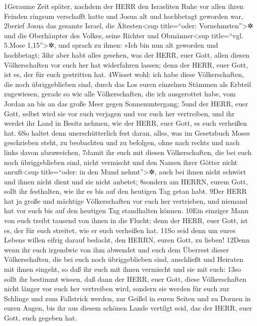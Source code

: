 1Geraume Zeit später, nachdem der HERR den Israeliten Ruhe vor allen
ihren Feinden ringsum verschafft hatte und Josua alt und hochbetagt
geworden war, 2berief Josua das gesamte Israel, die
Ältesten\textless sup title=``oder: Vornehmsten''\textgreater✲ und die
Oberhäupter des Volkes, seine Richter und Obmänner\textless sup
title=``vgl. 5.Mose 1,15''\textgreater✲, und sprach zu ihnen: »Ich bin
nun alt geworden und hochbetagt; 3ihr aber habt alles gesehen, was der
HERR, euer Gott, allen diesen Völkerschaften vor euch her hat
widerfahren lassen; denn der HERR, euer Gott, ist es, der für euch
gestritten hat. 4Wisset wohl: ich habe diese Völkerschaften, die noch
übriggeblieben sind, durch das Los euren einzelnen Stämmen als Erbteil
zugewiesen, gerade so wie alle Völkerschaften, die ich ausgerottet habe,
vom Jordan an bis an das große Meer gegen Sonnenuntergang; 5und der
HERR, euer Gott, selbst wird sie vor euch verjagen und vor euch her
vertreiben, und ihr werdet ihr Land in Besitz nehmen, wie der HERR, euer
Gott, es euch verheißen hat. 6So haltet denn unerschütterlich fest
daran, alles, was im Gesetzbuch Moses geschrieben steht, zu beobachten
und zu befolgen, ohne nach rechts und nach links davon abzuweichen,
7damit ihr euch mit diesen Völkerschaften, die bei euch noch
übriggeblieben sind, nicht vermischt und den Namen ihrer Götter nicht
anruft\textless sup title=``oder: in den Mund nehmt''\textgreater✲, auch
bei ihnen nicht schwört und ihnen nicht dient und sie nicht anbetet;
8sondern am HERRN, eurem Gott, sollt ihr festhalten, wie ihr es bis auf
den heutigen Tag getan habt. 9Der HERR hat ja große und mächtige
Völkerschaften vor euch her vertrieben, und niemand hat vor euch bis auf
den heutigen Tag standhalten können. 10Ein einziger Mann von euch treibt
tausend von ihnen in die Flucht; denn der HERR, euer Gott, ist es, der
für euch streitet, wie er euch verheißen hat. 11So seid denn um eures
Lebens willen eifrig darauf bedacht, den HERRN, euren Gott, zu lieben!
12Denn wenn ihr euch irgendwie von ihm abwendet und euch dem Überrest
dieser Völkerschaften, die bei euch noch übriggeblieben sind, anschließt
und Heiraten mit ihnen eingeht, so daß ihr euch mit ihnen vermischt und
sie mit euch: 13so sollt ihr bestimmt wissen, daß dann der HERR, euer
Gott, diese Völkerschaften nicht länger vor euch her vertreiben wird,
sondern sie werden für euch zur Schlinge und zum Fallstrick werden, zur
Geißel in euren Seiten und zu Dornen in euren Augen, bis ihr aus diesem
schönen Lande vertilgt seid, das der HERR, euer Gott, euch gegeben hat.

